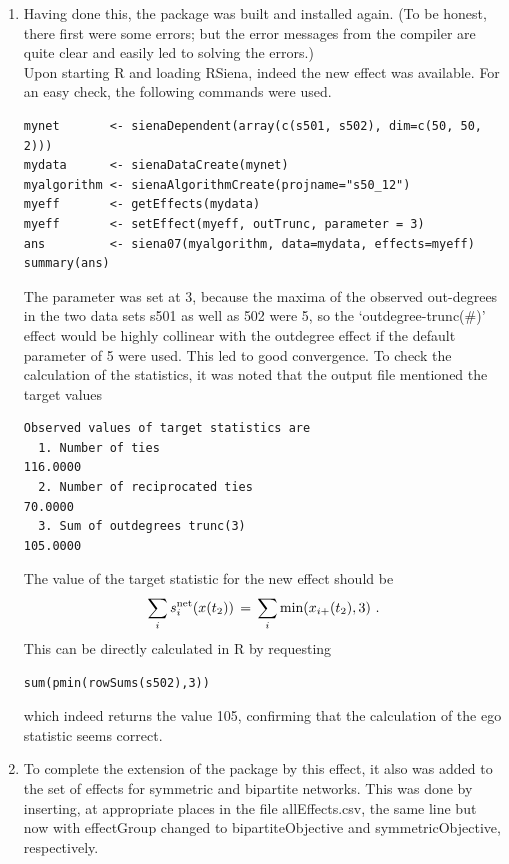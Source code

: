 \documentclass[a4paper,fleqn,11pt]{article}
\newcommand{\+}{\, + \,}
\newcommand{\sfn}[1]{\textsf{#1}}
\newcommand{\R}{{\sf R }}
\newcommand{\rs}{{\sf RSiena}}
\begin{document}
{\begin{enumerate}
\item Having done this, the package was built and installed again.
      (To be honest, there first were some errors; but the error messages
       from the compiler are quite clear and easily led to solving
       the errors.)\\
      Upon starting \R and loading \rs, indeed the new effect  was
      available. For an easy check, the following commands
      were used.
{\small
\begin{verbatim}
mynet       <- sienaDependent(array(c(s501, s502), dim=c(50, 50, 2)))
mydata      <- sienaDataCreate(mynet)
myalgorithm <- sienaAlgorithmCreate(projname="s50_12")
myeff       <- getEffects(mydata)
myeff       <- setEffect(myeff, outTrunc, parameter = 3)
ans         <- siena07(myalgorithm, data=mydata, effects=myeff)
summary(ans)
\end{verbatim}
}
      The parameter was set at 3, because the maxima of the
      observed out-degrees
      in the two data sets \sfn{s501} as well as \sfn{502} were 5,
      so the `outdegree-trunc(\#)' effect would be highly collinear with the
      outdegree effect if the default parameter of 5 were used.
      This led to good convergence. To check the calculation of the
      statistics, it was noted that the output file
      mentioned the target values
{\small
\begin{verbatim}
Observed values of target statistics are
  1. Number of ties                                           116.0000
  2. Number of reciprocated ties                               70.0000
  3. Sum of outdegrees trunc(3)                               105.0000
\end{verbatim}
}
      The value of the target statistic for the new effect should be
      \[
       \sum_i s^{\rm net}_{i}(x(t_2)) \,=\,
                         \sum_i \text{min}(x_{i+}(t_2), 3) \ .
      \]
      This can be directly calculated in \R by requesting
\begin{verbatim}
sum(pmin(rowSums(s502),3))
\end{verbatim}
      which indeed returns the value 105, confirming that the calculation
      of the ego statistic seems correct.
\item To complete the extension of the package by this effect,
      it also was added to the set of effects for symmetric
      and bipartite networks.
      This was done by inserting, at appropriate places in the file
      \sfn{allEffects.csv},
      the same line but now with \sfn{effectGroup}
      changed to \sfn{bipartiteObjective} and \sfn{symmetricObjective},
      respectively.
\end{enumerate}

}
\end{document}
